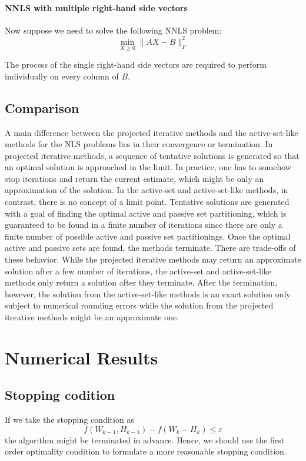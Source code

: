 \documentclass[conference,onecolumn,12pt]{IEEEtran}
\numberwithin{equation}{section}
\numberwithin{figure}{section}
\numberwithin{table}{section}
\theoremstyle{definition}
\begin{document}
\paragraph{NNLS with multiple right-hand side vectors} Now suppose we need to solve the following NNLS problem:
\begin{equation}
	\min_{X\geq 0}\|AX-B\|_F^2
\end{equation}

The process of the single right-hand side vectors are required to perform individually on every column of $B$. 
\subsection{Comparison}
A main difference between the projected iterative methods and the active-set-like methods for the NLS problems lies in their convergence or termination. In projected iterative methods, a sequence of tentative solutions is generated so that an optimal solution is approached in the limit. In practice, one has to somehow stop iterations and return the current estimate, which might be only an approximation of the solution. In the active-set and active-set-like methods, in contrast, there is no concept of a limit point. Tentative solutions are generated with a goal of finding the optimal active and passive set partitioning, which is guaranteed to be found in a finite number of iterations since there are only a finite number of possible active and passive set partitionings. Once the optimal active and passive sets are found, the methods terminate. There are trade-offs of these behavior. While the projected iterative methods may return an approximate solution after a few number of iterations, the active-set and active-set-like methods only return a solution after they terminate. After the termination, however, the solution from the active-set-like methods is an exact solution only subject to numerical rounding errors while the solution from the projected iterative methods might be an approximate one.



\section{Numerical Results}

\subsection{Stopping codition}
If we take the stopping condition as 
\begin{equation}
	f(W_{k-1},H_{k-1})-f(W_k-H_k)\leq \varepsilon
\end{equation}
the algorithm might be terminated in advance. Hence, we should use the first order optimality condition to formulate a more reasonable stopping condition.
\end{document}
